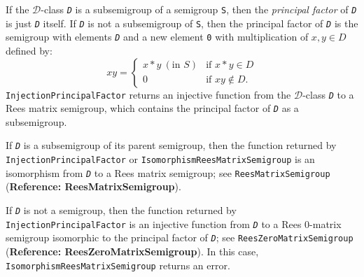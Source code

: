 \documentclass[a4paper,11pt]{report}
\begin{document}
{{{ If the $\mathcal{D}$-class \mbox{\texttt{\mdseries\slshape D}} is a subsemigroup of a semigroup \texttt{S}, then the \emph{principal factor} of \mbox{\texttt{\mdseries\slshape D}} is just \mbox{\texttt{\mdseries\slshape D}} itself. If \mbox{\texttt{\mdseries\slshape D}} is not a subsemigroup of \texttt{S}, then the principal factor of \mbox{\texttt{\mdseries\slshape D}} is the semigroup with elements \mbox{\texttt{\mdseries\slshape D}} and a new element \texttt{0} with multiplication of $x,y\in D$ defined by:  
\[ xy=\left\{\begin{array}{ll} x*y\ (\textrm{in }S)&\textrm{if }x*y\in D\\
0&\textrm{if }xy\not\in D. \end{array}\right. \]
   \texttt{InjectionPrincipalFactor} returns an injective function from the $\mathcal{D}$-class \mbox{\texttt{\mdseries\slshape D}} to a Rees matrix semigroup, which contains the principal factor of \mbox{\texttt{\mdseries\slshape D}} as a subsemigroup. 

 If \mbox{\texttt{\mdseries\slshape D}} is a subsemigroup of its parent semigroup, then the function returned by \texttt{InjectionPrincipalFactor} or \texttt{IsomorphismReesMatrixSemigroup} is an isomorphism from \mbox{\texttt{\mdseries\slshape D}} to a Rees matrix semigroup; see \texttt{ReesMatrixSemigroup} (\textbf{Reference: ReesMatrixSemigroup}).

 If \mbox{\texttt{\mdseries\slshape D}} is not a semigroup, then the function returned by \texttt{InjectionPrincipalFactor} is an injective function from \mbox{\texttt{\mdseries\slshape D}} to a Rees 0-matrix semigroup isomorphic to the principal factor of \mbox{\texttt{\mdseries\slshape D}}; see \texttt{ReesZeroMatrixSemigroup} (\textbf{Reference: ReesZeroMatrixSemigroup}). In this case, \texttt{IsomorphismReesMatrixSemigroup} returns an error.

}}}
\end{document}

